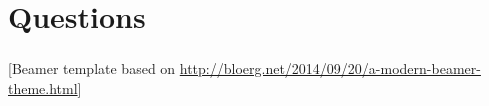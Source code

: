 \documentclass[10pt, compress]{beamer}
\begin{document}
\section*{Questions}

\begin{frame}
	\small
	\nocite{chapter, hamerly, elkan, lloyd}
	\frametitle{\bibname}
    
    
    \vfill
    \hfill \tiny [Beamer template based on \url{http://bloerg.net/2014/09/20/a-modern-beamer-theme.html}]
\end{frame}
\end{document}
